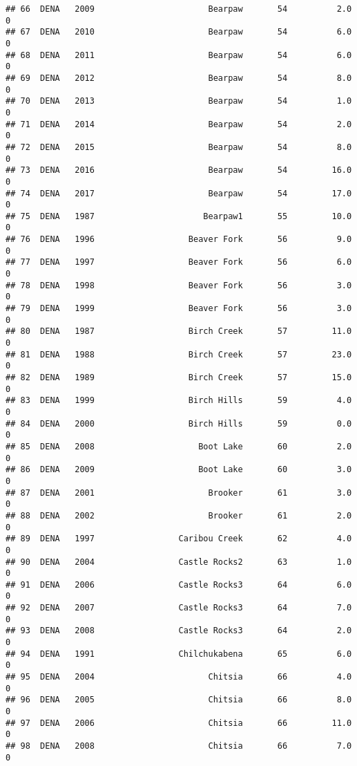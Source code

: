 \documentclass[
]{article}
\begin{document}
\begin{verbatim}
## 66  DENA   2009                       Bearpaw       54          2.0       0
## 67  DENA   2010                       Bearpaw       54          6.0       0
## 68  DENA   2011                       Bearpaw       54          6.0       0
## 69  DENA   2012                       Bearpaw       54          8.0       0
## 70  DENA   2013                       Bearpaw       54          1.0       0
## 71  DENA   2014                       Bearpaw       54          2.0       0
## 72  DENA   2015                       Bearpaw       54          8.0       0
## 73  DENA   2016                       Bearpaw       54         16.0       0
## 74  DENA   2017                       Bearpaw       54         17.0       0
## 75  DENA   1987                      Bearpaw1       55         10.0       0
## 76  DENA   1996                   Beaver Fork       56          9.0       0
## 77  DENA   1997                   Beaver Fork       56          6.0       0
## 78  DENA   1998                   Beaver Fork       56          3.0       0
## 79  DENA   1999                   Beaver Fork       56          3.0       0
## 80  DENA   1987                   Birch Creek       57         11.0       0
## 81  DENA   1988                   Birch Creek       57         23.0       0
## 82  DENA   1989                   Birch Creek       57         15.0       0
## 83  DENA   1999                   Birch Hills       59          4.0       0
## 84  DENA   2000                   Birch Hills       59          0.0       0
## 85  DENA   2008                     Boot Lake       60          2.0       0
## 86  DENA   2009                     Boot Lake       60          3.0       0
## 87  DENA   2001                       Brooker       61          3.0       0
## 88  DENA   2002                       Brooker       61          2.0       0
## 89  DENA   1997                 Caribou Creek       62          4.0       0
## 90  DENA   2004                 Castle Rocks2       63          1.0       0
## 91  DENA   2006                 Castle Rocks3       64          6.0       0
## 92  DENA   2007                 Castle Rocks3       64          7.0       0
## 93  DENA   2008                 Castle Rocks3       64          2.0       0
## 94  DENA   1991                 Chilchukabena       65          6.0       0
## 95  DENA   2004                       Chitsia       66          4.0       0
## 96  DENA   2005                       Chitsia       66          8.0       0
## 97  DENA   2006                       Chitsia       66         11.0       0
## 98  DENA   2008                       Chitsia       66          7.0       0

\end{verbatim}
\end{document}
